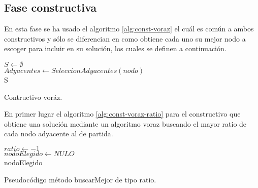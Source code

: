\subsection{Fase constructiva}

En esta fase se ha usado el algoritmo \ref{alg:const-voraz} el cuál es común a ambos constructivos y sólo se diferencian en como obtiene cada uno su mejor nodo a escoger para incluir en su solución, los cuales se definen a continuación.\\
\begin{algorithm}
	\SetAlgoLined
	$ S \gets \emptyset $  \\[0.2cm]
	$ Adyacentes \gets  SeleccionAdyacentes(nodo) $  \\[0.2cm]
	\Return S
	\caption{Contructivo voráz.}
	\label{alg:const-voraz}
\end{algorithm}

En primer lugar el algoritmo \ref{alg:const-voraz-ratio} para el constructivo que obtiene una solución mediante un algoritmo voraz buscando el mayor ratio de cada nodo adyacente al de partida.\\
\begin{algorithm}
	$ ratio \gets -1 $ \\[0.2cm]
	$ nodoElegido \gets NULO $ \\[0.2cm]
	\Return nodoElegido
	\caption{Pseudocódigo método buscarMejor de tipo ratio.}
	\label{alg:const-voraz-ratio}
\end{algorithm}


